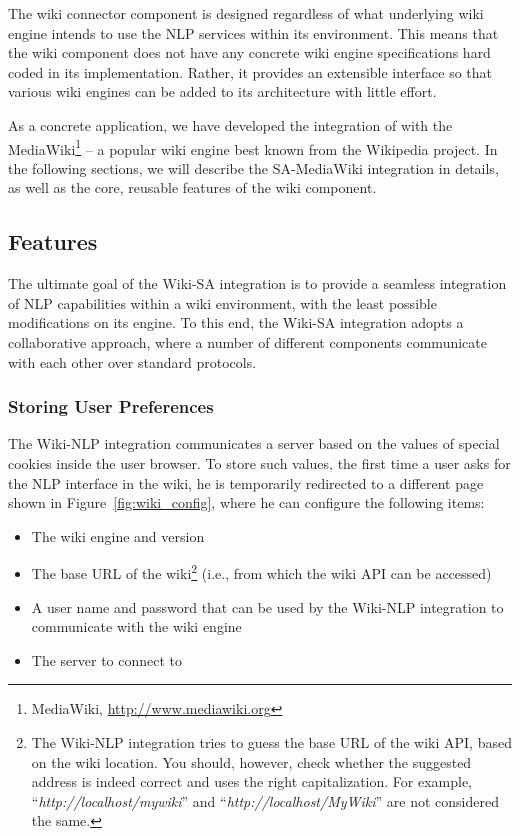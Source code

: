 The wiki connector component is designed regardless of what underlying wiki engine intends to use the NLP services within its environment. This means that the wiki component does not have any concrete wiki engine specifications hard coded in its implementation. Rather, it provides an extensible interface so that various wiki engines can be added to its architecture with little effort.

As a concrete application, we have developed the integration of \sa with the MediaWiki\footnote{MediaWiki, \url{http://www.mediawiki.org}} -- a popular wiki engine best known from the Wikipedia project. In the following sections, we will describe the SA-MediaWiki integration in details, as well as the core, reusable features of the wiki component.

\subsection{Features}
The ultimate goal of the Wiki-SA integration is to provide a seamless integration of NLP capabilities within a wiki environment, with the least possible modifications on its engine. To this end, the Wiki-SA integration adopts a collaborative approach, where a number of different components communicate with each other over standard protocols.

\subsubsection{Storing User Preferences} The Wiki-NLP integration communicates a \sa server based on the values of special cookies inside the user browser. To store such values, the first time a user asks for the NLP interface in the wiki, he is temporarily redirected to a different page shown in Figure~\ref{fig:wiki_config}, where he can configure the following items:

\begin{itemize}\itemsep1mm
\item The wiki engine and version
\item The base URL of the wiki\footnote{The Wiki-NLP integration tries to guess the base URL of the wiki API, based on the wiki location. You should, however, check whether the suggested address is indeed correct and uses the right capitalization. For example, ``\emph{http://localhost/mywiki}'' and ``\emph{http://localhost/MyWiki}'' are not considered the same.} (i.e., from which the wiki API can be accessed)
\item A user name and password that can be used by the Wiki-NLP integration to communicate with the wiki engine
\item The \sa server to connect to
\end{itemize}

